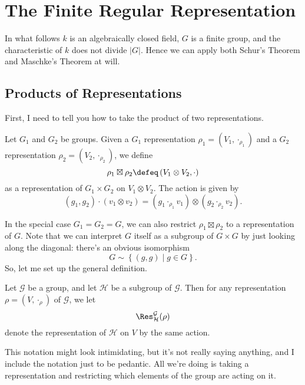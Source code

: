 \chapter{The Finite Regular Representation}
In what follows $k$ is an algebraically closed field, $G$ is a finite group, and the characteristic of $k$ does not divide $\left\lvert G \right\rvert$.
Hence we can apply both Schur's Theorem and Maschke's Theorem at will.


\section{Products of Representations}
First, I need to tell you how to take the product of two representations.
\begin{definition}
	Let $G_1$ and $G_2$ be groups.
	Given a $G_1$ representation $\rho_1 = (V_1, \cdot_{\rho_1})$ and a $G_2$ representation $\rho_2 = (V_2, \cdot_{\rho_2})$, we define
	\[ \rho_1 \boxtimes \rho_2 \defeq
	\left( V_1 \otimes V_2, \cdot \right) \]
	as a representation of $G_1 \times G_2$ on $V_1 \otimes V_2$.
	The action is given by
	\[ (g_1, g_2) \cdot (v_1 \otimes v_2)
	= \left( g_1 \cdot_{\rho_1} v_1 \right) \otimes (g_2 \cdot_{\rho_2} v_2). \]
\end{definition}

In the special case $G_1 = G_2 = G$, we can also restrict $\rho_1 \boxtimes \rho_2$ to a representation of $G$.
Note that we can interpret $G$ itself as a subgroup of $G \times G$ by just looking along the diagonal: there's an obvious isomorphism
\[ G \sim \left\{ (g,g) \mid g \in G \right\}. \]
So, let me set up the general definition.
\begin{definition}
	Let $\mathcal G$ be a group, and let $\mathcal H$ be a subgroup of $\mathcal G$. Then for any representation $\rho = (V, \cdot_\rho)$ of $\mathcal G$,
	we let 
	\[ \Res^{\mathcal G}_{\mathcal H} (\rho) \]
	denote the representation of $\mathcal H$ on $V$ by the same action.
\end{definition}
This notation might look intimidating, but it's not really saying anything, and I include the notation just to be pedantic.
All we're doing is taking a representation and restricting which elements of the group are acting on it.

